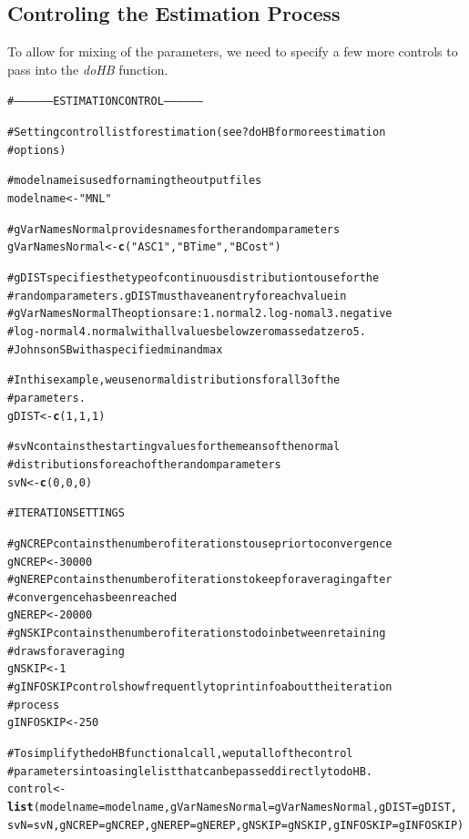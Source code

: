 \documentclass{article}\usepackage{graphicx, color}
\makeatletter
\newcommand{\hlfunctioncall}[1]{\textcolor[rgb]{0.501960784313725,0,0.329411764705882}{\textbf{#1}}}%
\newcommand{\hlstring}[1]{\textcolor[rgb]{0.6,0.6,1}{#1}}%
\newcommand{\hlcomment}[1]{\textcolor[rgb]{0.180392156862745,0.6,0.341176470588235}{#1}}%
\newenvironment{kframe}{%
 \def\at@end@of@kframe{}%
 \ifinner\ifhmode%
  \def\at@end@of@kframe{\end{minipage}}%
  \begin{minipage}{\columnwidth}%
 \fi\fi%
 \def\FrameCommand##1{\hskip\@totalleftmargin \hskip-\fboxsep
 \colorbox{shadecolor}{##1}\hskip-\fboxsep
     \hskip-\linewidth \hskip-\@totalleftmargin \hskip\columnwidth}%
 \MakeFramed {\advance\hsize-\width
   \@totalleftmargin\z@ \linewidth\hsize
   \@setminipage}}%
 {\par\unskip\endMakeFramed%
 \at@end@of@kframe}
\newenvironment{knitrout}{}{} %
\makeatother
\begin{document}
\subsection*{Controling the Estimation Process}

To allow for mixing of the parameters, we need to specify a few more controls to pass into the \emph{doHB} function.

\begin{knitrout}
\color{fgcolor}\begin{kframe}
\begin{alltt}

\hlcomment{# ------------------ ESTIMATION CONTROL ------------------}

\hlcomment{# Setting control list for estimation (see ?doHB for more estimation}
\hlcomment{# options)}

\hlcomment{# modelname is used for naming the output files}
modelname <- \hlstring{"MNL"}

\hlcomment{# gVarNamesNormal provides names for the random parameters}
gVarNamesNormal <- \hlfunctioncall{c}(\hlstring{"ASC1"}, \hlstring{"BTime"}, \hlstring{"BCost"})

\hlcomment{# gDIST specifies the type of continuous distribution to use for the}
\hlcomment{# random parameters. gDIST must have an entry for each value in}
\hlcomment{# gVarNamesNormal The options are: 1. normal 2. log-nomal 3. negative}
\hlcomment{# log-normal 4. normal with all values below zero massed at zero 5.}
\hlcomment{# Johnson SB with a specified min and max}

\hlcomment{# In this example, we use normal distributions for all 3 of the}
\hlcomment{# parameters.}
gDIST <- \hlfunctioncall{c}(1, 1, 1)

\hlcomment{# svN contains the starting values for the means of the normal}
\hlcomment{# distributions for each of the random parameters}
svN <- \hlfunctioncall{c}(0, 0, 0)

\hlcomment{# ITERATION SETTINGS}

\hlcomment{# gNCREP contains the number of iterations to use prior to convergence}
gNCREP <- 30000
\hlcomment{# gNEREP contains the number of iterations to keep for averaging after}
\hlcomment{# convergence has been reached}
gNEREP <- 20000
\hlcomment{# gNSKIP contains the number of iterations to do in between retaining}
\hlcomment{# draws for averaging}
gNSKIP <- 1
\hlcomment{# gINFOSKIP controls how frequently to print info about the iteration}
\hlcomment{# process}
gINFOSKIP <- 250

\hlcomment{# To simplify the doHB functional call, we put all of the control}
\hlcomment{# parameters into a single list that can be passed directly to doHB.}
control <- \hlfunctioncall{list}(modelname = modelname, gVarNamesNormal = gVarNamesNormal, gDIST = gDIST, 
    svN = svN, gNCREP = gNCREP, gNEREP = gNEREP, gNSKIP = gNSKIP, gINFOSKIP = gINFOSKIP)

\end{alltt}
\end{kframe}
\end{knitrout}
\end{document}
